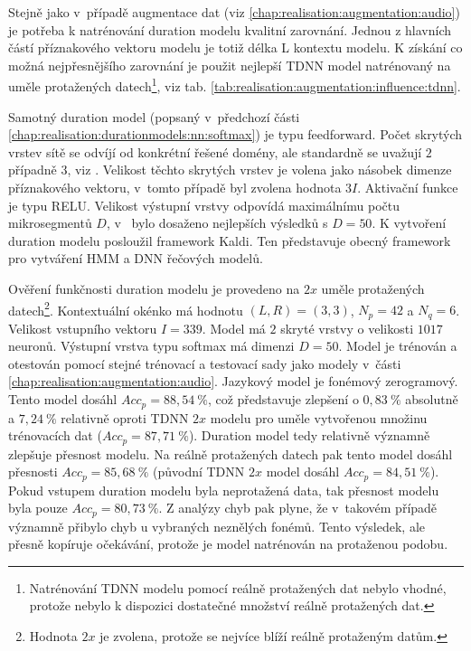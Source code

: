 Stejně jako v~případě augmentace dat (viz \ref{chap:realisation:augmentation:audio}) je potřeba k natrénování duration modelu kvalitní zarovnání. Jednou z hlavních částí příznakového vektoru modelu je totiž délka L kontextu modelu. K získání co možná nejpřesnějšího zarovnání je použit nejlepší TDNN model natrénovaný na uměle protažených datech\footnote{Natrénování TDNN modelu pomocí reálně protažených dat nebylo vhodné, protože nebylo k dispozici dostatečné množství reálně protažených dat.}, viz tab. \ref{tab:realisation:augmentation:influence:tdnn}.

Samotný duration model (popsaný v~předchozí části \ref{chap:realisation:durationmodels:nn:softmax}) je typu feedforward.  Počet skrytých vrstev sítě se odvíjí od konkrétní řešené domény, ale standardně se uvažují $2$ případně $3$, viz \cite{Hadian2017}. Velikost těchto skrytých vrstev je volena jako násobek dimenze příznakového vektoru, v~tomto případě byl zvolena hodnota $3I$. Aktivační funkce je typu RELU. Velikost výstupní vrstvy odpovídá maximálnímu počtu mikrosegmentů $D$, v~\cite{Hadian2017} bylo dosaženo nejlepších výsledků s $D=50$. K vytvoření duration modelu posloužil framework Kaldi. Ten představuje obecný framework pro vytváření HMM a DNN řečových modelů.

Ověření funkčnosti duration modelu je provedeno na $2x$ uměle protažených datech\footnote{Hodnota $2x$ je zvolena, protože se nejvíce blíží reálně protaženým datům.}. Kontextuální okénko má hodnotu $\left(L, R\right) = \left(3, 3\right)$, $N_{p} = 42$ a $N_{q} = 6$. Velikost vstupního vektoru $I = 339$. Model má $2$ skryté vrstvy o velikosti $1017$ neuronů. Výstupní vrstva typu softmax má dimenzi $D=50$. Model je trénován a otestován pomocí stejné trénovací a testovací sady jako modely v~části \ref{chap:realisation:augmentation:audio}. Jazykový model je fonémový zerogramový. Tento model dosáhl $Acc_{p} = 88,54\ \%$, což představuje zlepšení o $0,83\ \%$ absolutně a $7,24\ \%$ relativně oproti TDNN $2x$ modelu pro uměle vytvořenou množinu trénovacích dat ($Acc_{p} = 87,71\ \%$). Duration model tedy relativně významně zlepšuje přesnost modelu. Na reálně protažených datech pak tento model dosáhl přesnosti $Acc_{p} = 85,68\ \%$ (původní TDNN $2x$ model dosáhl $Acc_{p} = 84,51\ \%$). Pokud vstupem duration modelu byla neprotažená data, tak přesnost modelu byla pouze $Acc_{p} = 80,73\ \%$. Z analýzy chyb pak plyne, že v~takovém případě významně přibylo chyb u vybraných neznělých fonémů. Tento výsledek, ale přesně kopíruje očekávání, protože je model natrénován na protaženou podobu.

